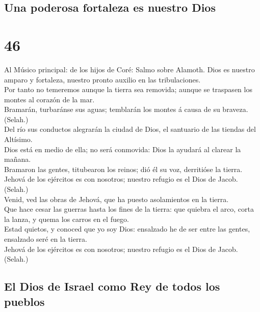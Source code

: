 \hypertarget{una-poderosa-fortaleza-es-nuestro-dios}{%
\subsection{Una poderosa fortaleza es nuestro
Dios}\label{una-poderosa-fortaleza-es-nuestro-dios}}

\hypertarget{section-19-46}{%
\section{46}\label{section-19-46}}

 Al Músico principal: de los hijos de Coré: Salmo sobre
Alamoth. Dios es nuestro amparo y fortaleza, nuestro pronto auxilio en
las tribulaciones.\\
 Por tanto no temeremos aunque la tierra sea removida;
aunque se traspasen los montes al corazón de la mar.\\
 Bramarán, turbaránse sus aguas; temblarán los montes á
causa de su braveza. (Selah.)\\
 Del río sus conductos alegrarán la ciudad de Dios, el
santuario de las tiendas del Altísimo.\\
 Dios está en medio de ella; no será conmovida: Dios la
ayudará al clarear la mañana.\\
 Bramaron las gentes, titubearon los reinos; dió él su
voz, derritióse la tierra.\\
 Jehová de los ejércitos es con nosotros; nuestro refugio
es el Dios de Jacob. (Selah.)\\
 Venid, ved las obras de Jehová, que ha puesto
asolamientos en la tierra.\\
 Que hace cesar las guerras hasta los fines de la tierra:
que quiebra el arco, corta la lanza, y quema los carros en el fuego.\\
 Estad quietos, y conoced que yo soy Dios: ensalzado he
de ser entre las gentes, ensalzado seré en la tierra.\\
 Jehová de los ejércitos es con nosotros; nuestro refugio
es el Dios de Jacob. (Selah.)

\hypertarget{el-dios-de-israel-como-rey-de-todos-los-pueblos}{%
\subsection{El Dios de Israel como Rey de todos los
pueblos}\label{el-dios-de-israel-como-rey-de-todos-los-pueblos}}

